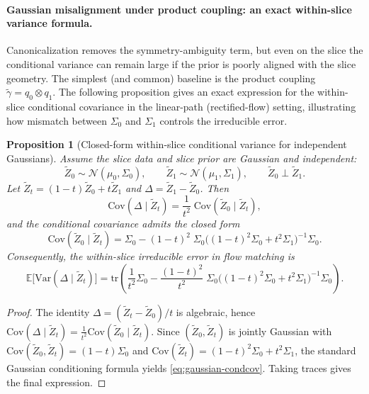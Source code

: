 \documentclass{article}
\theoremstyle{plain}
\newtheorem{proposition}[theorem]{Proposition}
\theoremstyle{definition}
\theoremstyle{remark}
\newcommand{\1}{\mathbf{1}}
\begin{document}
\paragraph{Gaussian misalignment under product coupling: an exact within-slice variance formula.}
Canonicalization removes the symmetry-ambiguity term, but even on the slice the conditional variance can remain large if the
prior is poorly aligned with the slice geometry. The simplest (and common) baseline is the product coupling
$\widetilde\gamma=q_0\otimes q_1$. The following proposition gives an exact expression for the within-slice conditional covariance
in the linear-path (rectified-flow) setting, illustrating how mismatch between $\Sigma_0$ and $\Sigma_1$ controls the irreducible error.

\begin{proposition}[Closed-form within-slice conditional variance for independent Gaussians]
\label{prop:gaussian-product-condvar}
Assume the slice data and slice prior are Gaussian and independent:
\[
\widetilde Z_0\sim \mathcal{N}(\mu_0,\Sigma_0),\qquad
\widetilde Z_1\sim \mathcal{N}(\mu_1,\Sigma_1),\qquad
\widetilde Z_0 \perp \widetilde Z_1.
\]
Let $\widetilde Z_t = (1-t)\widetilde Z_0+t\widetilde Z_1$ and $\Delta=\widetilde Z_1-\widetilde Z_0$. Then
\begin{equation}
\mathrm{Cov}(\Delta\mid \widetilde Z_t)
= \frac{1}{t^2}\;\mathrm{Cov}(\widetilde Z_0\mid \widetilde Z_t),
\end{equation}
and the conditional covariance admits the closed form
\begin{equation}
\mathrm{Cov}(\widetilde Z_0\mid \widetilde Z_t)=
\Sigma_0 - (1-t)^2\;\Sigma_0\Big((1-t)^2\Sigma_0+t^2\Sigma_1\Big)^{-1}\Sigma_0.
\label{eq:gaussian-condcov}
\end{equation}
Consequently, the within-slice irreducible error in flow matching is
\begin{equation}
\mathbb{E}\big[\mathrm{Var}(\Delta\mid \widetilde Z_t)\big]=
\mathrm{tr}\!\left(
\frac{1}{t^2}\Sigma_0 - \frac{(1-t)^2}{t^2}\;\Sigma_0\Big((1-t)^2\Sigma_0+t^2\Sigma_1\Big)^{-1}\Sigma_0
\right).
\end{equation}
\end{proposition}

\begin{proof}
The identity $\Delta = (\widetilde Z_t - \widetilde Z_0)/t$ is algebraic, hence
$\mathrm{Cov}(\Delta\mid \widetilde Z_t)=\frac{1}{t^2}\mathrm{Cov}(\widetilde Z_0\mid \widetilde Z_t)$.
Since $(\widetilde Z_0,\widetilde Z_t)$ is jointly Gaussian with
$\mathrm{Cov}(\widetilde Z_0,\widetilde Z_t)=(1-t)\Sigma_0$ and
$\mathrm{Cov}(\widetilde Z_t)=(1-t)^2\Sigma_0+t^2\Sigma_1$, the standard Gaussian conditioning formula yields
\eqref{eq:gaussian-condcov}. Taking traces gives the final expression.
\end{proof}
\end{document}
